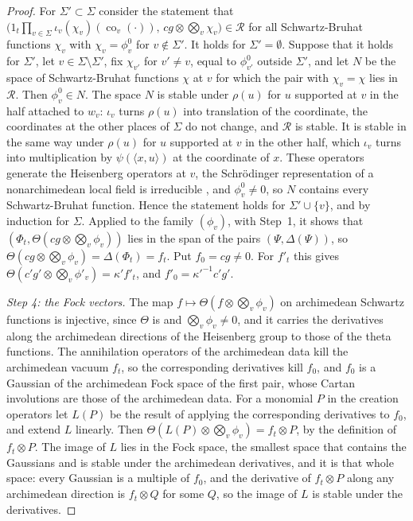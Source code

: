 \begin{proof}
For $\Sigma'\subset\Sigma$ consider the statement that
$\bigl(1_t\prod_{v\in\Sigma}\iota_v(\chi_v)(\operatorname{co}_v(\cdot)),\,cg\otimes\bigotimes_v\chi_v\bigr)\in\mathcal R$
for all Schwartz-Bruhat functions $\chi_v$ with $\chi_v=\phi^0_v$ for
$v\notin\Sigma'$. It holds for $\Sigma'=\emptyset$. Suppose that it holds for
$\Sigma'$, let $v\in\Sigma\setminus\Sigma'$, fix $\chi_{v'}$ for $v'\neq v$,
equal to $\phi^0_{v'}$ outside $\Sigma'$, and let $N$ be the space of
Schwartz-Bruhat functions $\chi$ at $v$ for which the pair with $\chi_v=\chi$
lies in $\mathcal R$. Then $\phi^0_v\in N$. The space $N$ is stable under
$\rho(u)$ for $u$ supported at $v$ in the half attached to $w_v$: $\iota_v$
turns $\rho(u)$ into translation of the coordinate, the coordinates at the
other places of $\Sigma$ do not change, and $\mathcal R$ is stable. It is
stable in the same way under $\rho(u)$ for $u$ supported at $v$ in the other
half, which $\iota_v$ turns into multiplication by $\psi(\langle x,u\rangle)$ at
the coordinate of $x$. These operators generate the Heisenberg operators at
$v$, the Schrödinger representation of a nonarchimedean local field is
irreducible \cite{MVW87}, and $\phi^0_v\neq0$, so $N$ contains every
Schwartz-Bruhat function. Hence the statement holds for $\Sigma'\cup\{v\}$, and
by induction for $\Sigma$. Applied to the family $(\phi_v)$, with Step~1, it
shows that $(\Phi_t,\Theta(cg\otimes\bigotimes_v\phi_v))$ lies in the span of
the pairs $(\Psi,\Delta(\Psi))$, so
$\Theta(cg\otimes\bigotimes_v\phi_v)=\Delta(\Phi_t)=f_t$. Put $f_0=cg\neq0$.
For $f'_t$ this gives $\Theta(c'g'\otimes\bigotimes_v\phi'_v)=\kappa'f'_t$, and
$f'_0=\kappa'^{-1}c'g'$.

\emph{Step 4: the Fock vectors.} The map
$f\mapsto\Theta(f\otimes\bigotimes_v\phi_v)$ on archimedean Schwartz functions
is injective, since $\Theta$ is and $\bigotimes_v\phi_v\neq0$, and it carries
the derivatives along the archimedean directions of the Heisenberg group to
those of the theta functions. The annihilation operators of the archimedean
data kill the archimedean vacuum $f_t$, so the corresponding derivatives kill
$f_0$, and $f_0$ is a Gaussian of the archimedean Fock space of the first pair,
whose Cartan involutions are those of the archimedean data. For a monomial $P$
in the creation operators let $L(P)$ be the result of applying the
corresponding derivatives to $f_0$, and extend $L$ linearly. Then
$\Theta(L(P)\otimes\bigotimes_v\phi_v)=f_t\otimes P$, by the definition of
$f_t\otimes P$. The image of $L$ lies in the Fock space, the smallest space
that contains the Gaussians and is stable under the archimedean derivatives,
and it is that whole space: every Gaussian is a multiple of $f_0$, and the
derivative of $f_t\otimes P$ along any archimedean direction is $f_t\otimes Q$
for some $Q$, so the image of $L$ is stable under the derivatives.
\end{proof}

